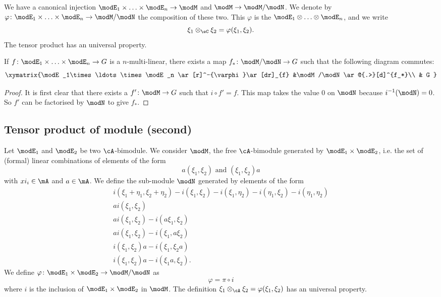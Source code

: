 We have a canonical injection $\modE_1\times\ldots\times\modE_n\to\modM$ and $\modM\to\modM/\modN$. We denote by $\varphi\colon \modE_1\times\ldots\times\modE_n\to \modM/\modN$ the composition of these two. This $\varphi$ is the  $\modE_1\otimes\ldots\otimes\modE_n$, and we write
\[
	\xi_1\otimes_{\eC}\xi_2=\varphi(\xi_1,\xi_2).
\]
The tensor product has an universal property.

\begin{proposition}
	If $f\colon \modE_1\times\ldots\times\modE_n\to G$ is a $n$-multi-linear, there exists a map $f_*\colon \modM/\modN\to G$ such that the following diagram commutes:
	\begin{equation}
		\xymatrix{%
		\modE_1\times\ldots\times\modE_n \ar[r]^-{\varphi}\ar[dr]_{f}		&\modM/\modN\ar@{.>}[d]^{f_*}\\
		&	G
		}
	\end{equation}
\end{proposition}

\begin{proof}
	It is first clear that there exists a $f'\colon \modM\to G$ such that $i\circ f'=f$. This map takes the value $0$ on $\modN$ because $i^{-1}(\modN)=0$. So $f'$ can be factorised by $\modN$ to give $f_*$.
\end{proof}

\subsection{Tensor product of module (second)}

Let $\modE_1$ and $\modE_2$ be two $\cA$-bimodule. We consider $\modM$, the free $\cA$-bimodule generated by $\modE_1\times\modE_2$, i.e. the set of (formal) linear combinations of elements of the form
\[
	a(\xi_1,\xi_2)\text{ and }(\xi_1,\xi_2)a
\]
with $xi_i\in\mA$ and $a\in\mA$. We define the sub-module $\modN$ generated by elements of the form
\begin{subequations}
	\begin{align}
		i(\xi_1+\eta_1,\xi_2+\eta_2)-i(\xi_1,\xi_2)-i(\xi_1,\eta_2)-i(\eta_1,\xi_2)-i(\eta_1,\eta_2) \\
		ai(\xi_1,\xi_2)                                                                              \\
		ai(\xi_1,\xi_2)-i(a\xi_1,\xi_2)                                                              \\
		ai(\xi_1,\xi_2)-i(\xi_1,a\xi_2)                                                              \\
		i(\xi_1,\xi_2)a-i(\xi_1,\xi_2a)                                                              \\
		i(\xi_1,\xi_2)a-i(\xi_1a,\xi_2).
	\end{align}
\end{subequations}
We define $\varphi\colon \modE_1\times\modE_2\to \modM/\modN$ as
\[
	\varphi=\pi\circ i
\]
where $i$ is the inclusion of $\modE_1\times\modE_2$ in $\modM$. The definition $\xi_1\otimes_{\cA}\xi_2=\varphi(\xi_1,\xi_2)$ has an universal property.

